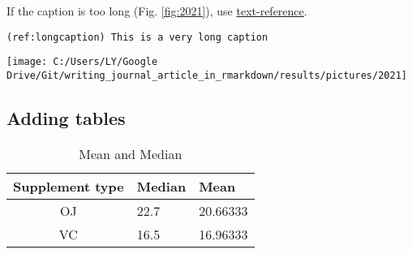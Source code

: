 \documentclass[review]{elsarticle} %
\newenvironment{Shaded}{\begin{snugshade}}{\end{snugshade}}
\newcommand{\BaseNTok}[1]{\textcolor[rgb]{0.00,0.00,0.81}{#1}}
\newcommand{\NormalTok}[1]{#1}
\let\origfigure\figure
\let\endorigfigure\endfigure
\renewenvironment{figure}[1][2] {
    \expandafter\origfigure\expandafter[H]
} {
    \endorigfigure
}
\begin{document}
If the caption is too long (Fig. \ref{fig:2021}), use
\href{https://bookdown.org/yihui/rmarkdown/bookdown-markdown.html\#text-references}{text-reference}.

\texttt{(ref:longcaption)\ This\ is\ a\ very\ long\ caption}

\begin{Shaded}
\end{Shaded}



\begin{figure}

{\centering \texttt{[image: C:/Users/LY/Google Drive/Git/writing\_journal\_article\_in\_rmarkdown/results/pictures/2021]} 

}

\caption{This is a very long caption}\label{fig:2021}
\end{figure}

\subsection{Adding tables}\label{table}

\begin{Shaded}
\end{Shaded}

\begin{table}

\caption{\label{tab:unnamed-chunk-2}\label{tab:cooltable}Mean and Median}
\centering
\begin{tabular}[t]{cll}
\toprule
Supplement type & Median & Mean\\
\midrule
OJ & 22.7 & 20.66333\\
VC & 16.5 & 16.96333\\
\bottomrule
\end{tabular}
\end{table}
\end{document}
